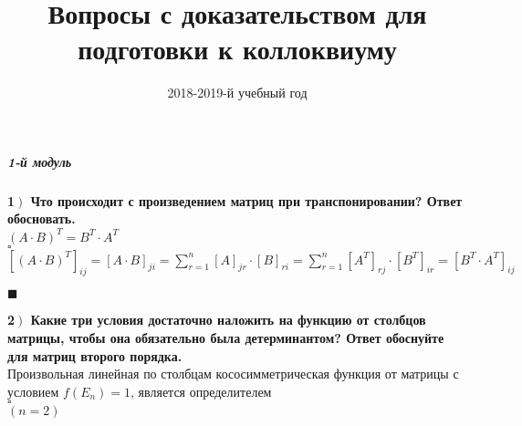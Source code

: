 \documentclass[a4paper,12pt]{article}
\author{2018-2019-й учебный год}
\title{Вопросы с доказательством для подготовки к коллоквиуму}
\date{}
\begin{document}
	\maketitle

	\subparagraph{1-й модуль}
	\textbf{1$\left.\right)$ Что происходит с произведением матриц при транспонировании? Ответ обосновать.} \\$(A\cdot B)^T=B^T\cdot A^T$\\
	$\square$\\
	$[(A\cdot B)^T]_{ij}=[A\cdot B]_{ji}=\sum\limits_{r=1}^n [A]_{jr}\cdot[B]_{ri} = \sum\limits_{r=1}^n [A^T]_{rj}\cdot[B^T]_{ir} = [B^T\cdot A^T]_{ij}$
	\begin{flushright}
		$\blacksquare$
	\end{flushright}
\textbf{2$\left.\right)$ Какие три условия достаточно наложить на функцию от столбцов матрицы, чтобы она обязательно была детерминантом? Ответ обоснуйте для матриц второго порядка.}\\ Произвольная линейная по столбцам кососимметрическая функция от матрицы с условием $f(E_n)=1$, является определителем\\
$\square$\\
$(n=2)$\\
\end{document}
